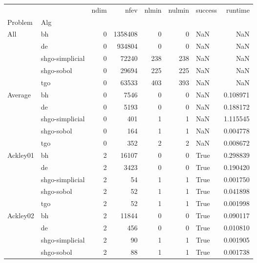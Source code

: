 \begin{longtable}{llrrrrlr}
\bottomrule
\endlastfoot
\toprule
         &    &  ndim &     nfev &  nlmin &  nulmin & success &     runtime \\
Problem & Alg &       &          &        &         &         &             \\
\midrule
All & bh &     0 &  1358408 &      0 &       0 &     NaN &         NaN \\
         & de &     0 &   934804 &      0 &       0 &     NaN &         NaN \\
         & shgo-simplicial &     0 &    72240 &    238 &     238 &     NaN &         NaN \\
         & shgo-sobol &     0 &    29694 &    225 &     225 &     NaN &         NaN \\
         & tgo &     0 &    63533 &    403 &     393 &     NaN &         NaN \\
\midrule
Average & bh &     0 &     7546 &      0 &       0 &     NaN &    0.108971 \\
         & de &     0 &     5193 &      0 &       0 &     NaN &    0.188172 \\
         & shgo-simplicial &     0 &      401 &      1 &       1 &     NaN &    1.115545 \\
         & shgo-sobol &     0 &      164 &      1 &       1 &     NaN &    0.004778 \\
         & tgo &     0 &      352 &      2 &       2 &     NaN &    0.008672 \\
         \midrule
Ackley01 & bh &     2 &    16107 &      0 &       0 &    True &    0.298839 \\
         & de &     2 &     3423 &      0 &       0 &    True &    0.190420 \\
         & shgo-simplicial &     2 &       54 &      1 &       1 &    True &    0.001750 \\
         & shgo-sobol &     2 &       52 &      1 &       1 &    True &    0.041898 \\
         & tgo &     2 &       52 &      1 &       1 &    True &    0.001998 \\
Ackley02 & bh &     2 &    11844 &      0 &       0 &    True &    0.090117 \\
         & de &     2 &      456 &      0 &       0 &    True &    0.010810 \\
         & shgo-simplicial &     2 &       90 &      1 &       1 &    True &    0.001905 \\
         & shgo-sobol &     2 &       88 &      1 &       1 &    True &    0.001738 \\

\end{longtable}
